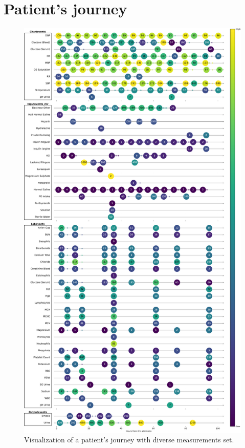 \chapter{Patient's journey}
\label{ch:patient_journey}
\begin{figure}[H]
    \centering
    \includegraphics[height=0.95\textheight, width=\textwidth,keepaspectratio]{./figures/journey_275225}
    \caption{Visualization of a patient's journey with diverse measurements set. }
    \label{fig:journey_275225}
\end{figure}

